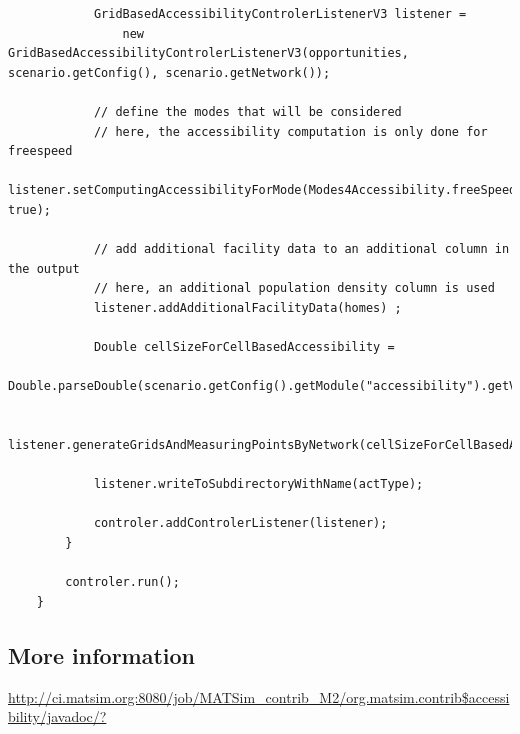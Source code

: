 \begin{lstlisting}
			GridBasedAccessibilityControlerListenerV3 listener = 
				new GridBasedAccessibilityControlerListenerV3(opportunities, scenario.getConfig(), scenario.getNetwork());

			// define the modes that will be considered
			// here, the accessibility computation is only done for freespeed
			listener.setComputingAccessibilityForMode(Modes4Accessibility.freeSpeed, true);

			// add additional facility data to an additional column in the output
			// here, an additional population density column is used
			listener.addAdditionalFacilityData(homes) ;
			
			Double cellSizeForCellBasedAccessibility = 
					Double.parseDouble(scenario.getConfig().getModule("accessibility").getValue("cellSizeForCellBasedAccessibility"));

			listener.generateGridsAndMeasuringPointsByNetwork(cellSizeForCellBasedAccessibility);
						
			listener.writeToSubdirectoryWithName(actType);
			
			controler.addControlerListener(listener);
		}
					
		controler.run();
	}
\end{lstlisting}

\subsection{More information}

\url{http://ci.matsim.org:8080/job/MATSim_contrib_M2/org.matsim.contrib$accessibility/javadoc/?}

%



